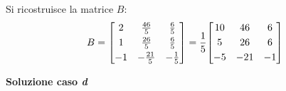 \documentclass[a4paper]{article}
\makeatletter
\newenvironment{rowequmatbra}[1]{\left[\array{@{}#1@{}}}{\endarray\right]}
\makeatother
\begin{document}
	Si ricostruisce la matrice $B$:
	\begin{equation*}
		B = \begin{rowequmatbra}{ccc}
			2 	& \frac{46}{5}	& \frac{6}{5} \\ [0.3em]
			1 	& \frac{26}{5}	& \frac{6}{5} \\ [0.3em]
			-1	& -\frac{21}{5}	& -\frac{1}{5}
		\end{rowequmatbra} = \dfrac{1}{5} \begin{rowequmatbra}{ccc}
			10 	& 46	& 6 \\ [0.3em]
			5	& 26	& 6 \\ [0.3em]
			-5	& -21	& -1
		\end{rowequmatbra}
	\end{equation*}\newpage
	
	\noindent
	\textcolor{Green4}{\textbf{Soluzione caso \emph{d}}}\newline
	
\end{document}
